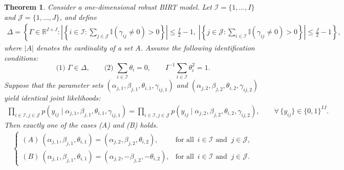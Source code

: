 \documentclass[11pt]{article}
\newtheorem{theorem}{Theorem} \newtheorem{theoremstar}{Theorem}
\begin{document}
\begin{theorem}\label{theorem2}
    Consider a one-dimensional robust BIRT model. Let 
    $\mathcal{I}=\{1,\ldots,I\}$ and $\mathcal{J}=\{1,\ldots,J\}$, and define
    \begin{align*}
        \Delta 
        = \left\{
        \Gamma \in \mathbb{R}^{I \times J} :
        \left| \left\{ 
        i \in \mathcal{I} : \sum_{j \in \mathcal{J}} \mathbb{I}(\gamma_{ij} \neq 0) > 0 
        \right\} \right| \le \frac{I}{2}-1,\;
        \left| \left\{ 
        j \in \mathcal{J} : \sum_{i \in \mathcal{I}} \mathbb{I}(\gamma_{ij} \neq 0) > 0 
        \right\} \right| \le \frac{J}{2}-1
        \right\},
    \end{align*}
    where $|A|$ denotes the cardinality of a set $A$. Assume the following identification conditions:
    \begin{equation*}
        \text{(1) }\Gamma \in \Delta,\qquad
        \text{(2) }\sum_{i\in\mathcal{I}} \theta_i = 0,\qquad
        I^{-1}\sum_{i\in\mathcal{I}} \theta_i^2 = 1.
    \end{equation*}
    Suppose that the parameter sets 
    $(\alpha_{j,1}, \beta_{j,1}, \theta_{i,1}, \gamma_{ij,1})$ and 
    $(\alpha_{j,2}, \beta_{j,2}, \theta_{i,2}, \gamma_{ij,2})$ 
    yield identical joint likelihoods:
    \begin{align}\label{eqn:eqn1}
        \prod_{i\in\mathcal{I}, j\in\mathcal{J}}
        p(y_{ij} \mid \alpha_{j,1}, \beta_{j,1}, \theta_{i,1}, \gamma_{ij,1})
        =
        \prod_{i\in\mathcal{I}, j\in\mathcal{J}}
        p(y_{ij} \mid \alpha_{j,2}, \beta_{j,2}, \theta_{i,2}, \gamma_{ij,2}),
        \qquad 
        \forall\, \{y_{ij}\}\in\{0,1\}^{IJ}.
    \end{align}
    Then exactly one of the cases (A) and (B) holds.
    \begin{align}\label{eqn:eqn2}
        \begin{cases}
        (A)~(\alpha_{j,1},\beta_{j,1},\theta_{i,1})
             =(\alpha_{j,2},\beta_{j,2},\theta_{i,2}),
             &\text{for all }\, i\in\mathcal{I} \text{ and }\ j\in\mathcal{J},\\[4pt]
        (B)~(\alpha_{j,1},\beta_{j,1},\theta_{i,1})
             =(\alpha_{j,2},-\beta_{j,2},-\theta_{i,2}),
             &\text{for all }\, i\in\mathcal{I} \text{ and }\ j\in\mathcal{J}.
        \end{cases}
    \end{align}
\end{theorem}
\end{document}
